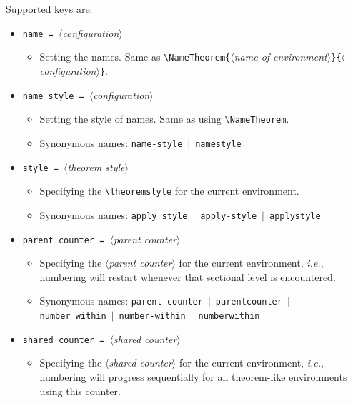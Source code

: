 \documentclass[classical]{einfart}
\providecommand{\meta}[1]{$\langle${\normalfont\itshape#1}$\rangle$}
\newcommand{\commandoption}[1]{\texttt{\textcolor{black!67!cyan}{#1}}}
\begin{document}
Supported keys are:
\vspace{-.2\baselineskip}
\begin{itemize}
    \item \commandoption{name}\lstinline| = |\meta{configuration}
        \begin{itemize}
            \item Setting the names. Same as \lstinline|\NameTheorem{|\meta{name of environment}\lstinline|}{|\meta{configuration}\lstinline|}|.
        \end{itemize}
    \item \commandoption{name style}\lstinline| = |\meta{configuration}
        \begin{itemize}
            \item Setting the style of names. Same as using \lstinline|\NameTheorem|.
            \item Synonymous names: \commandoption{name-style} \,$|$\, \commandoption{namestyle}
        \end{itemize}
    \item \commandoption{style}\lstinline| = |\meta{theorem style}
        \begin{itemize}
            \item Specifying the \lstinline|\theoremstyle| for the current environment.
            \item Synonymous names: \commandoption{apply style} \,$|$\, \commandoption{apply-style} \,$|$\, \commandoption{applystyle}
        \end{itemize}
    \item \commandoption{parent counter}\lstinline| = |\meta{parent counter}
        \begin{itemize}
            \item Specifying the \meta{parent counter} for the current environment, \emph{i.e.}, numbering will restart whenever that sectional level is encountered.
            \item Synonymous names: \commandoption{parent-counter} \,$|$\, \commandoption{parentcounter} \,$|$\, \\\phantom{Synonymous names: }\commandoption{number within} \,$|$\, \commandoption{number-within} \,$|$\, \commandoption{numberwithin}
        \end{itemize}
    \item \commandoption{shared counter}\lstinline| = |\meta{shared counter}
        \begin{itemize}
            \item Specifying the \meta{shared counter} for the current environment, \emph{i.e.}, numbering will progress sequentially for all theorem-like environments using this counter.

\end{itemize}
\end{itemize}
\end{document}

